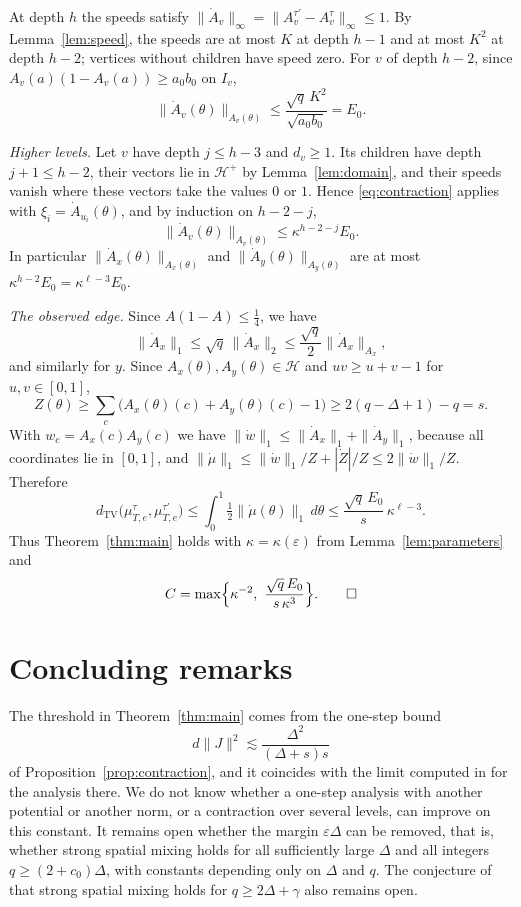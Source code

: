 \documentclass{amsart}
\numberwithin{equation}{section}
\theoremstyle{plain}
\theoremstyle{definition}
\theoremstyle{remark}
\newcommand{\dTV}{d_{\mathrm{TV}}}
\newcommand{\cH}{\mathcal{H}}
\begin{document}
At depth $h$ the speeds satisfy $\|\dot A_v\|_\infty=\|A_v^{\tau'}-A_v^\tau\|_\infty\le1$. By Lemma~\ref{lem:speed}, the speeds are at most $K$ at depth $h-1$ and at most $K^2$ at depth $h-2$; vertices without children have speed zero. For $v$ of depth $h-2$, since $A_v(a)(1-A_v(a))\ge a_0b_0$ on $I_v$,
\[
\|\dot A_v(\theta)\|_{A_v(\theta)}\le\frac{\sqrt q\,K^2}{\sqrt{a_0b_0}}=E_0 .
\]

\emph{Higher levels.} Let $v$ have depth $j\le h-3$ and $d_v\ge1$. Its children have depth $j+1\le h-2$, their vectors lie in $\cH^+$ by Lemma~\ref{lem:domain}, and their speeds vanish where these vectors take the values $0$ or $1$. Hence \eqref{eq:contraction} applies with $\xi_i=\dot A_{u_i}(\theta)$, and by induction on $h-2-j$,
\[
\|\dot A_v(\theta)\|_{A_v(\theta)}\le\kappa^{h-2-j}E_0 .
\]
In particular $\|\dot A_x(\theta)\|_{A_x(\theta)}$ and $\|\dot A_y(\theta)\|_{A_y(\theta)}$ are at most $\kappa^{h-2}E_0=\kappa^{\ell-3}E_0$.

\emph{The observed edge.} Since $A(1-A)\le\frac14$, we have
\[
\|\dot A_x\|_1\le\sqrt q\,\|\dot A_x\|_2\le\frac{\sqrt q}{2}\|\dot A_x\|_{A_x},
\]
and similarly for $y$. Since $A_x(\theta),A_y(\theta)\in\cH$ and $uv\ge u+v-1$ for $u,v\in[0,1]$,
\[
Z(\theta)\ge\sum_c\bigl(A_x(\theta)(c)+A_y(\theta)(c)-1\bigr)\ge2(q-\Delta+1)-q=s .
\]
With $w_c=A_x(c)A_y(c)$ we have $\|\dot w\|_1\le\|\dot A_x\|_1+\|\dot A_y\|_1$, because all coordinates lie in $[0,1]$, and $\|\dot\mu\|_1\le\|\dot w\|_1/Z+|\dot Z|/Z\le2\|\dot w\|_1/Z$. Therefore
\[
\dTV\bigl(\mu_{T,e}^\tau,\mu_{T,e}^{\tau'}\bigr)\le\int_0^1\tfrac12\|\dot\mu(\theta)\|_1\,d\theta\le\frac{\sqrt q\,E_0}{s}\,\kappa^{\ell-3}.
\]
Thus Theorem~\ref{thm:main} holds with $\kappa=\kappa(\varepsilon)$ from Lemma~\ref{lem:parameters} and
\[
C=\max\Bigl\{\kappa^{-2},\ \frac{\sqrt q\,E_0}{s\,\kappa^{3}}\Bigr\}.\qed
\]

\section{Concluding remarks}\label{sec:remarks}
\enlargethispage{-6\baselineskip}

The threshold in Theorem~\ref{thm:main} comes from the one-step bound
\[
d\|J\|^2\lesssim\frac{\Delta^2}{(\Delta+s)s}
\]
of Proposition~\ref{prop:contraction}, and it coincides with the limit computed in \cite[Theorem~35]{CWZZ} for the analysis there. We do not know whether a one-step analysis with another potential or another norm, or a contraction over several levels, can improve on this constant. It remains open whether the margin $\varepsilon\Delta$ can be removed, that is, whether strong spatial mixing holds for all sufficiently large $\Delta$ and all integers $q\ge(2+c_0)\Delta$, with constants depending only on $\Delta$ and $q$. The conjecture of \cite{CWZZ} that strong spatial mixing holds for $q\ge2\Delta+\gamma$ also remains open.
\end{document}
